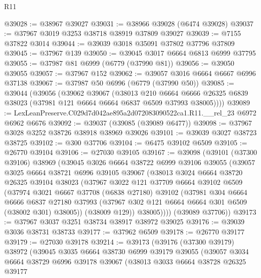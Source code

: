 \begin{lexlean}{R11}
\begin{coremodule}
@39028 := @38967 @39027
@39031 := @38966 @39028 (@6474 @39028)
@39037 := @37967 @3019 @3253 @38718 @38919 @37809 @39027
@39039 := @7155 @37822 @3014
@39044 := @39039 @3018 @35091 @37802 @37796 @37809
@39045 := @37967 @139
@39050 := @39045 @3017 @6664 @6813 @6999 @37795
@39055 := @37987 @81 @6999 (@6779 (@37990 @81))
@39056 := @39050 @39055
@39057 := @37967 @152
@39062 := @39057 @3016 @6664 @6667 @6996 @37138
@39067 := @37987 @50 @6996 (@6779 (@37990 @50))
@39085 := @39044
    (@39056
      (@39062
        @39067
        (@38013
          @210
          @6664
          @6666
          @26325
          @6839
          @38023
          (@37981 @121 @6664 @6664 @6837 @6509 @37993 @38005))))
@39089 := LexLeanPreserve.C029d7d042ae895a2d072083090522ca1.R11.__rel_23 @6972 @6962 @6676
@39092 := @39037 (@39085 (@39089 @6477))
@39098 := @37967 @3028 @3252 @38726 @38918 @38969 @39026
@39101 := @39039 @3027 @38723 @38725
@39102 := @300 @37706
@39104 := @6475 @39102 @6509
@39105 := @26770 @39104
@39106 := @27030 @39105
@39167 := @39098
    (@39101
      (@37300 @39106)
      @38969
      (@39045
        @3026
        @6664
        @38722
        @6999
        @39106
        @39055
        (@39057
          @3025
          @6664
          @38721
          @6996
          @39105
          @39067
          (@38013
            @3024
            @6664
            @38720
            @26325
            @39104
            @38023
            (@37967
              @3022
              @121
              @37709
              @6664
              @39102
              @6509
              (@37974
                @3021
                @6667
                @37708
                (@6838 @27180)
                @39102
                (@37981
                  @304
                  @6664
                  @6666
                  @6837
                  @27180
                  @37993
                  (@37967 @302 @121 @6664 @6664 @301 @6509 (@38002 @301) @38005))
                (@38009 @129))
              @38005))))
      (@39089 @37706))
@39173 := @37967 @3037 @3251 @38734 @38917 @38972 @39025
@39176 := @39039 @3036 @38731 @38733
@39177 := @37962 @6509
@39178 := @26770 @39177
@39179 := @27030 @39178
@39214 := @39173
    (@39176
      (@37300 @39179)
      @38972
      (@39045
        @3035
        @6664
        @38730
        @6999
        @39179
        @39055
        (@39057
          @3034
          @6664
          @38729
          @6996
          @39178
          @39067
          (@38013
            @3033
            @6664
            @38728
            @26325
            @39177

\end{coremodule}
\end{lexlean}
